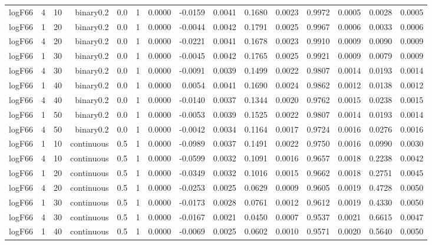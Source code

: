 \begin{longtable}{rrrrrrrrrrrrrrr}
  logF66 & 4 & 10 & binary0.2 & 0.0 & 1 & 0.0000 & -0.0159 & 0.0041 & 0.1680 & 0.0023 & 0.9972 & 0.0005 & 0.0028 & 0.0005 \\ 
  logF66 & 1 & 20 & binary0.2 & 0.0 & 1 & 0.0000 & -0.0044 & 0.0042 & 0.1791 & 0.0025 & 0.9967 & 0.0006 & 0.0033 & 0.0006 \\ 
  logF66 & 4 & 20 & binary0.2 & 0.0 & 1 & 0.0000 & -0.0221 & 0.0041 & 0.1678 & 0.0023 & 0.9910 & 0.0009 & 0.0090 & 0.0009 \\ 
  logF66 & 1 & 30 & binary0.2 & 0.0 & 1 & 0.0000 & -0.0045 & 0.0042 & 0.1765 & 0.0025 & 0.9921 & 0.0009 & 0.0079 & 0.0009 \\ 
  logF66 & 4 & 30 & binary0.2 & 0.0 & 1 & 0.0000 & -0.0091 & 0.0039 & 0.1499 & 0.0022 & 0.9807 & 0.0014 & 0.0193 & 0.0014 \\ 
  logF66 & 1 & 40 & binary0.2 & 0.0 & 1 & 0.0000 & 0.0054 & 0.0041 & 0.1690 & 0.0024 & 0.9862 & 0.0012 & 0.0138 & 0.0012 \\ 
  logF66 & 4 & 40 & binary0.2 & 0.0 & 1 & 0.0000 & -0.0140 & 0.0037 & 0.1344 & 0.0020 & 0.9762 & 0.0015 & 0.0238 & 0.0015 \\ 
  logF66 & 1 & 50 & binary0.2 & 0.0 & 1 & 0.0000 & -0.0053 & 0.0039 & 0.1525 & 0.0022 & 0.9807 & 0.0014 & 0.0193 & 0.0014 \\ 
  logF66 & 4 & 50 & binary0.2 & 0.0 & 1 & 0.0000 & -0.0042 & 0.0034 & 0.1164 & 0.0017 & 0.9724 & 0.0016 & 0.0276 & 0.0016 \\ 
  logF66 & 1 & 10 & continuous & 0.5 & 1 & 0.0000 & -0.0989 & 0.0037 & 0.1491 & 0.0022 & 0.9750 & 0.0016 & 0.0990 & 0.0030 \\ 
  logF66 & 4 & 10 & continuous & 0.5 & 1 & 0.0000 & -0.0599 & 0.0032 & 0.1091 & 0.0016 & 0.9657 & 0.0018 & 0.2238 & 0.0042 \\ 
  logF66 & 1 & 20 & continuous & 0.5 & 1 & 0.0000 & -0.0349 & 0.0032 & 0.1016 & 0.0015 & 0.9662 & 0.0018 & 0.2751 & 0.0045 \\ 
  logF66 & 4 & 20 & continuous & 0.5 & 1 & 0.0000 & -0.0253 & 0.0025 & 0.0629 & 0.0009 & 0.9605 & 0.0019 & 0.4728 & 0.0050 \\ 
  logF66 & 1 & 30 & continuous & 0.5 & 1 & 0.0000 & -0.0173 & 0.0028 & 0.0761 & 0.0012 & 0.9612 & 0.0019 & 0.4330 & 0.0050 \\ 
  logF66 & 4 & 30 & continuous & 0.5 & 1 & 0.0000 & -0.0167 & 0.0021 & 0.0450 & 0.0007 & 0.9537 & 0.0021 & 0.6615 & 0.0047 \\ 
  logF66 & 1 & 40 & continuous & 0.5 & 1 & 0.0000 & -0.0069 & 0.0025 & 0.0602 & 0.0010 & 0.9571 & 0.0020 & 0.5640 & 0.0050 \\ 

\end{longtable}
